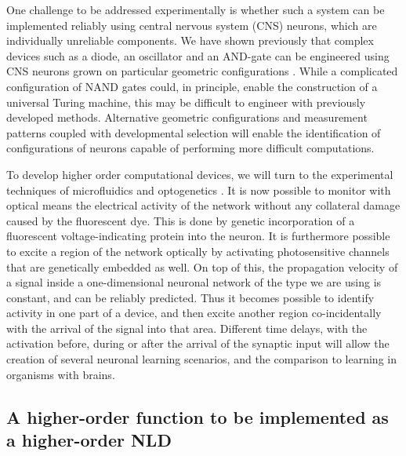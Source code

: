 One challenge to be addressed experimentally is whether such a system can be implemented reliably using central nervous system (CNS) neurons, which are individually unreliable components. We have shown previously that complex devices such as a diode, an oscillator and an AND-gate can be engineered using CNS neurons grown on particular geometric configurations \cite{Feinerman2008}. While a complicated configuration of NAND gates could, in principle, enable the construction of a universal Turing machine, this may be difficult to engineer with previously developed methods. Alternative geometric configurations and measurement patterns coupled with developmental selection will enable the identification of configurations of neurons capable of performing more difficult computations.

To develop higher order computational devices, we will turn to the experimental techniques of microfluidics and optogenetics \cite{Yizhar2011,Kralj2012}.
It is now possible to monitor with optical means the electrical activity of the network without any collateral damage caused by the fluorescent dye. This is done by genetic incorporation of a fluorescent voltage-indicating protein into the neuron. It is furthermore possible to excite a region of the network optically by activating photosensitive channels that are genetically embedded as well. On top of this, the propagation velocity of a signal inside a one-dimensional neuronal network of the type we are using is constant, and can be reliably predicted. Thus it becomes possible to identify activity in one part of a device, and then excite another region co-incidentally with the arrival of the signal into that area. Different time delays, with the activation before, during or after the arrival of the synaptic input will allow the creation of several neuronal learning scenarios, and the comparison to learning in organisms with brains.

\subsection{A higher-order function to be implemented as a higher-order NLD}

